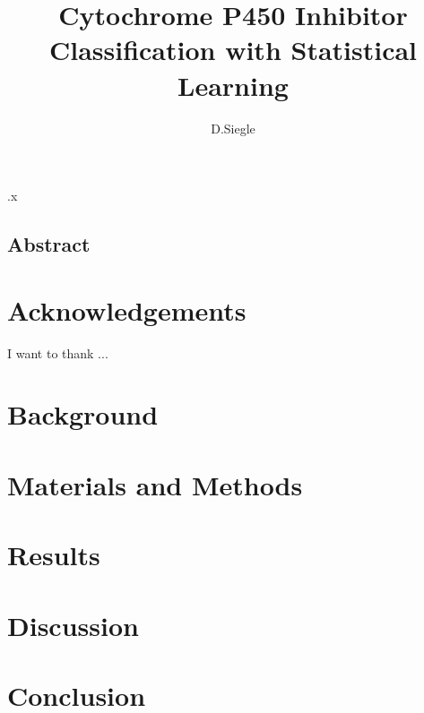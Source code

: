 .x\documentclass[12pt]{report}
\author{D.Siegle}
\title{Cytochrome P450 Inhibitor Classification with Statistical Learning}
\date{}
\begin{document}
\maketitle

\begin{doublespacing}
\chapter*{Abstract}

\end{doublespacing}

\tableofcontents
\listoffigures
\listoftables

\begin{doublespacing}
\chapter*{Acknowledgements}
I want to thank ...

\chapter{Background}


\chapter{Materials and Methods}


\chapter{Results}




\chapter{Discussion}


\chapter{Conclusion}


\end{doublespacing}

{}

\end{document}
